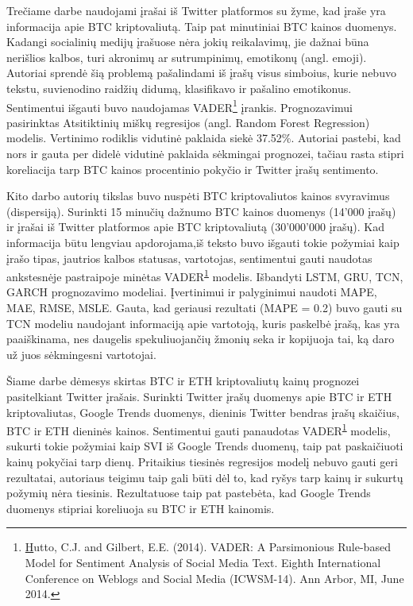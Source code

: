 \documentclass[12pt,a4paper]{article}
\begin{document}
Trečiame darbe \cite{sattarov2020seok} naudojami įrašai iš Twitter platformos su žyme, kad įraše yra informacija apie BTC kriptovaliutą. Taip pat minutiniai BTC kainos duomenys.
Kadangi socialinių medijų įrašuose nėra jokių reikalavimų, jie dažnai būna nerišlios kalbos, turi akronimų ar sutrumpinimų, emotikonų (angl. emoji). Autoriai sprendė šią problemą pašalindami iš įrašų visus simboius, kurie nebuvo tekstu, suvienodino raidžių didumą, klasifikavo ir pašalino emotikonus. Sentimentui išgauti buvo naudojamas VADER\footnote{
\label{vader}
\href{https://ojs.aaai.org/index.php/ICWSM/article/view/14550}
Hutto, C.J. and Gilbert, E.E. (2014). VADER: A Parsimonious Rule-based Model for Sentiment Analysis of Social Media Text. Eighth International Conference on Weblogs and Social Media (ICWSM-14). Ann Arbor, MI, June 2014.} įrankis. Prognozavimui pasirinktas Atsitiktinių miškų regresijos (angl. Random Forest Regression) modelis. Vertinimo rodiklis vidutinė paklaida siekė 37.52\%. Autoriai pastebi, kad nors ir gauta per didelė vidutinė paklaida sėkmingai prognozei, tačiau rasta stipri koreliacija tarp BTC kainos procentinio pokyčio ir Twitter įrašų sentimento.\newline

Kito darbo \cite{akbiyik2021erkul} autorių tikslas buvo nuspėti BTC kriptovaliutos kainos svyravimus (dispersiją). Surinkti 15 minučių dažnumo BTC kainos duomenys (14'000 įrašų) ir įrašai iš Twitter platformos apie BTC kriptovaliutą (30'000'000 įrašų). Kad informacija būtu lengviau apdorojama,iš teksto buvo išgauti tokie požymiai kaip įrašo tipas, jautrios kalbos statusas, vartotojas, sentimentui gauti naudotas ankstesnėje pastraipoje minėtas VADER\textsuperscript{\ref{vader}} modelis. Išbandyti LSTM, GRU, TCN, GARCH prognozavimo modeliai. Įvertinimui ir palyginimui naudoti MAPE, MAE, RMSE, MSLE. Gauta, kad geriausi rezultati (MAPE = 0.2) buvo gauti su TCN modeliu naudojant informaciją apie vartotoją, kuris paskelbė įrašą, kas yra paaiškinama, nes daugelis spekuliuojančių žmonių seka ir kopijuoja tai, ką daro už juos sėkmingesni vartotojai.\newline

Šiame darbe \cite{abraham2018higdon} dėmesys skirtas BTC ir ETH kriptovaliutų kainų prognozei pasitelkiant Twitter įrašais. Surinkti Twitter įrašų duomenys apie BTC ir ETH kriptovaliutas, Google Trends duomenys, dieninis Twitter bendras įrašų skaičius, BTC ir ETH dieninės kainos. Sentimentui gauti panaudotas VADER\textsuperscript{\ref{vader}} modelis, sukurti tokie požymiai kaip SVI iš Google Trends duomenų, taip pat paskaičiuoti kainų pokyčiai tarp dienų. Pritaikius tiesinės regresijos modelį nebuvo gauti geri rezultatai, autoriaus teigimu taip gali būti dėl to, kad ryšys tarp kainų ir sukurtų požymių nėra tiesinis. Rezultatuose taip pat pastebėta, kad Google Trends duomenys stipriai koreliuoja su BTC ir ETH kainomis.
\end{document}
